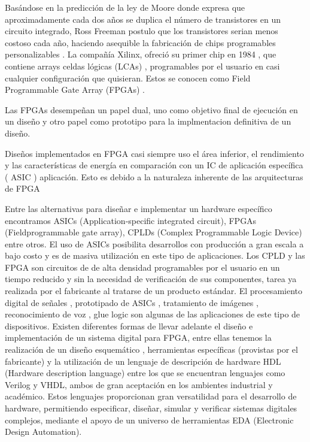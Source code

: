 \documentclass[a4paper,11pt]{article}
\begin{document}
Basándose en la predicción de la ley de Moore donde expresa que aproximadamente cada dos años se duplica el número de transistores en un circuito integrado\cite{Etiqueta01}, Ross Freeman postulo que los transistores serian menos costoso cada año, haciendo asequible la fabricación de chips programables personalizables \cite{Etiqueta03}.
La compañía Xilinx, ofreció su primer chip en 1984 , que contiene arrays celdas lógicas (LCAs) , programables por el usuario en casi cualquier configuración que quisieran. Estos se conocen como Field Programmable Gate Array (FPGAs) .

Las FPGAs desempeñan un papel dual, uno como objetivo final de ejecución en un diseño y otro papel como prototipo para la implmentacion definitiva de un diseño.



Diseños implementados en FPGA casi siempre uso el área inferior, el rendimiento y las características de energía en comparación con un IC de aplicación específica ( ASIC ) aplicación. Esto es debido a la naturaleza inherente de las arquitecturas de FPGA 







Entre las alternativas para diseñar e implementar un hardware específico encontramos ASICs (Application-specific integrated circuit), FPGAs (Fieldprogrammable
gate array), CPLDs (Complex Programmable Logic Device) entre otros.
El uso de ASICs posibilita desarrollos con producción a gran escala a bajo costo y es de masiva utilización en este tipo de aplicaciones. Los CPLD y las FPGA son circuitos de de alta densidad programables por el usuario en un tiempo reducido y sin la necesidad de verificación de sus componentes, tarea ya realizada por el fabricante al tratarse de un
producto estándar. El procesamiento digital de señales , prototipado de ASICs , tratamiento de imágenes , reconocimiento de voz , glue logic son algunas de las aplicaciones
de este tipo de dispositivos. Existen diferentes formas de llevar adelante el diseño e implementación de un sistema digital para FPGA, entre ellas tenemos la realización de un
diseño esquemático , herramientas específicas (provistas por el fabricante) y la utilización de un lenguaje de descripción de hardware HDL (Hardware description language) entre los que se encuentran lenguajes como Verilog y VHDL, ambos de gran aceptación en los ambientes industrial y académico. Estos lenguajes proporcionan gran versatilidad para
el desarrollo de hardware, permitiendo especificar, diseñar, simular y verificar sistemas digitales complejos, mediante el apoyo de un universo de herramientas EDA (Electronic
Design Automation).
\end{document}
